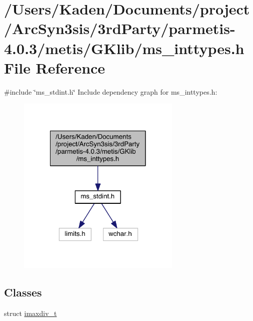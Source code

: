 \hypertarget{a00113}{}\section{/\+Users/\+Kaden/\+Documents/project/\+Arc\+Syn3sis/3rd\+Party/parmetis-\/4.0.3/metis/\+G\+Klib/ms\+\_\+inttypes.h File Reference}
\label{a00113}
{\ttfamily \#include \char`\"{}ms\+\_\+stdint.\+h\char`\"{}}\newline
Include dependency graph for ms\+\_\+inttypes.\+h\+:\nopagebreak
\begin{figure}[H]
\begin{center}
\leavevmode
\includegraphics[width=222pt]{a00114}
\end{center}
\end{figure}
\subsection*{Classes}
\begin{DoxyCompactItemize}
\item 
struct \hyperlink{a00702}{imaxdiv\+\_\+t}
\end{DoxyCompactItemize}
